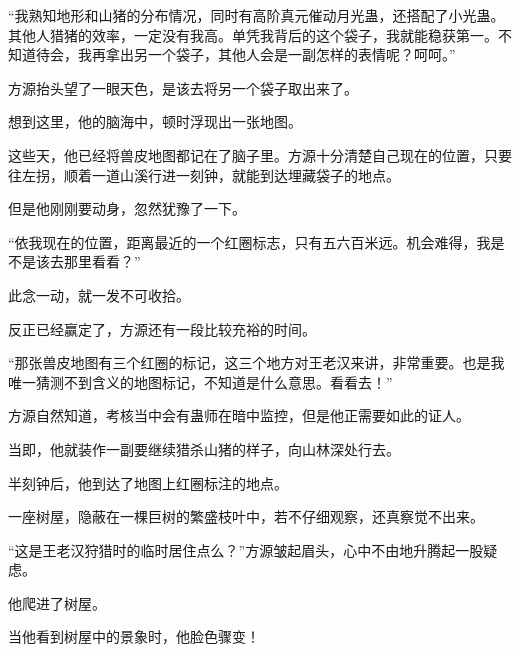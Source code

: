 \begin{this_body}
“我熟知地形和山猪的分布情况，同时有高阶真元催动月光蛊，还搭配了小光蛊。其他人猎猪的效率，一定没有我高。单凭我背后的这个袋子，我就能稳获第一。不知道待会，我再拿出另一个袋子，其他人会是一副怎样的表情呢？呵呵。”

方源抬头望了一眼天色，是该去将另一个袋子取出来了。

想到这里，他的脑海中，顿时浮现出一张地图。

这些天，他已经将兽皮地图都记在了脑子里。方源十分清楚自己现在的位置，只要往左拐，顺着一道山溪行进一刻钟，就能到达埋藏袋子的地点。

但是他刚刚要动身，忽然犹豫了一下。

“依我现在的位置，距离最近的一个红圈标志，只有五六百米远。机会难得，我是不是该去那里看看？”

此念一动，就一发不可收拾。

反正已经赢定了，方源还有一段比较充裕的时间。

“那张兽皮地图有三个红圈的标记，这三个地方对王老汉来讲，非常重要。也是我唯一猜测不到含义的地图标记，不知道是什么意思。看看去！”

方源自然知道，考核当中会有蛊师在暗中监控，但是他正需要如此的证人。

当即，他就装作一副要继续猎杀山猪的样子，向山林深处行去。

半刻钟后，他到达了地图上红圈标注的地点。

一座树屋，隐蔽在一棵巨树的繁盛枝叶中，若不仔细观察，还真察觉不出来。

“这是王老汉狩猎时的临时居住点么？”方源皱起眉头，心中不由地升腾起一股疑虑。

他爬进了树屋。

当他看到树屋中的景象时，他脸色骤变！

\end{this_body}

